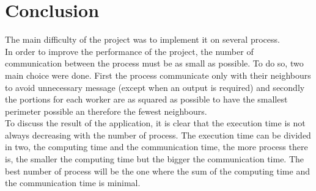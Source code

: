 \documentclass[a4paper,12pt]{article}
\begin{document}
\section{Conclusion}
The main difficulty of the project was to implement it on several process.\\
In order to improve the performance of the project, the number of communication between the process must be as small as possible. To do so, two main choice were done. First the process communicate only with their neighbours to avoid unnecessary message (except when an output is required) and secondly the portions for each worker are as squared as possible to have the smallest perimeter possible an therefore the fewest neighbours.\\
To discuss the result of the application, it is clear that the execution time is not always decreasing with the number of process. The execution time can be divided in two, the computing time and the communication time, the more process there is, the smaller the computing time but the bigger the communication time. The best number of process will be the one where the sum of the computing time and the communication time is minimal.
\end{document}
